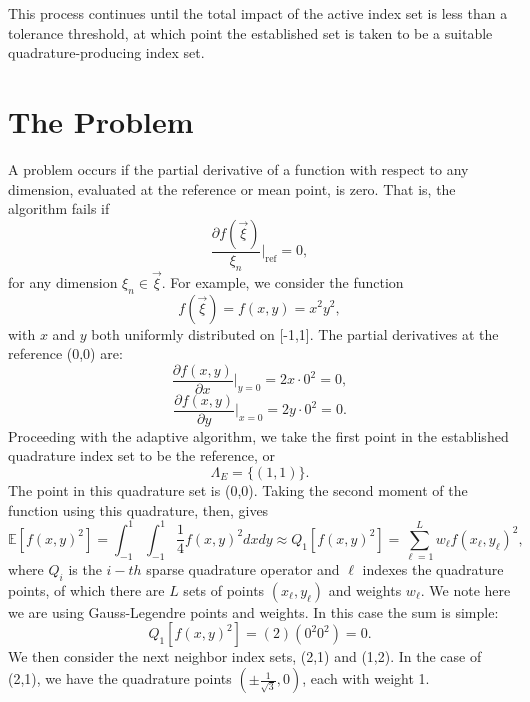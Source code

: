 \documentclass[11pt]{article}
\newcommand{\expv}[1]{\ensuremath{\mathbb{E}[ #1]}}
\begin{document}
 This process continues until the total impact of the active index set is less than a tolerance threshold, at which point the established set is taken to be a suitable quadrature-producing index set. 

\section{The Problem}
A problem occurs if the partial derivative of a function with respect to any dimension, evaluated at the reference or mean point, is zero.  That is, the algorithm fails if
\begin{equation}
\frac{\partial f(\vec\xi)}{\xi_n}\Bigg|_\text{ref} = 0,
\end{equation}
for any dimension $\xi_n\in\vec\xi$.  For example, we consider the function
\begin{equation}
f(\vec\xi)=f(x,y)=x^2y^2,
\end{equation}
with $x$ and $y$ both uniformly distributed on [-1,1].  The partial derivatives at the reference (0,0) are:
\begin{equation}
\frac{\partial f(x,y)}{\partial x}\Bigg|_{y=0} = 2x\cdot 0^2 = 0,
\end{equation}
\begin{equation}
\frac{\partial f(x,y)}{\partial y}\Bigg|_{x=0} = 2y\cdot 0^2 = 0.
\end{equation}
Proceeding with the adaptive algorithm,
we take the first point in the established quadrature index set to be the reference, or
\begin{equation}
\Lambda_E = \{ (1,1) \}.
\end{equation}
The point in this quadrature set is (0,0).  Taking the second moment of the function using this quadrature, then, gives
\begin{equation}
\expv{f(x,y)^2}=\int_{-1}^1 \int_{-1}^1 \frac{1}{4} f(x,y)^2 dx dy\approx Q_1[f(x,y)^2] = \sum_{\ell=1}^L w_\ell f(x_\ell,y_\ell)^2,
\end{equation}
where $Q_i$ is the $i-th$ sparse quadrature operator and $\ell$ indexes the quadrature points, of which there are $L$ sets of points $(x_\ell,y_\ell)$ and weights $w_\ell$.  We note here we are using Gauss-Legendre points and weights. In this case the sum is simple:
\begin{equation}
Q_1[f(x,y)^2] = (2)(0^2 0^2) = 0.
\end{equation}
We then consider the next neighbor index sets, (2,1) and (1,2).  In the case of (2,1), we have the quadrature points $(\pm \frac{1}{\sqrt{3}},0)$, each with weight 1.
\end{document}
